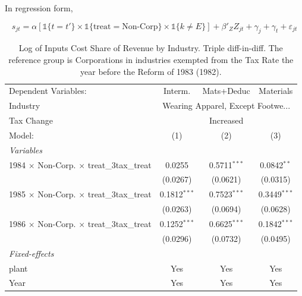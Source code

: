 \documentclass[
  12pt]{article}
\theoremstyle{definition}
\theoremstyle{remark}
\begin{document}
In regression form,

\[
s_{jt}=\alpha \left[ \mathbb{1}\{t=t'\}\times\mathbb{1}\{\text{treat}=\text{Non-Corp}\}\times\mathbb{1}\{k\not=E\} \right]+\beta'_ZZ_{jt}+\gamma_j+\gamma_t+\varepsilon_{jt}
\]

\begin{table}

\caption{\label{tbl-reg-didid}Log of Inputs Cost Share of Revenue by
Industry. Triple diff-in-diff. The reference group is Corporations in
industries exempted from the Tax Rate the year before the Reform of 1983
(1982).}

\begin{minipage}{\linewidth}

\begingroup
\centering
\begin{tabular}{lccc}
   \tabularnewline \midrule \midrule
   Dependent Variables:                                    & Interm.        & Mats+Deduc     & Materials\\  
   Industry & \multicolumn{3}{c}{Wearing Apparel, Except Footwe...} \\ 
   Tax Change & \multicolumn{3}{c}{Increased} \\ 
   Model:                                                  & (1)            & (2)            & (3)\\  
   \midrule
   \emph{Variables}\\
   1984 $\times$ Non-Corp. $\times$ treat\_3tax\_treat     & 0.0255         & 0.5711$^{***}$ & 0.0842$^{**}$\\   
                                                           & (0.0267)       & (0.0621)       & (0.0315)\\   
   1985 $\times$ Non-Corp. $\times$ treat\_3tax\_treat     & 0.1812$^{***}$ & 0.7523$^{***}$ & 0.3449$^{***}$\\   
                                                           & (0.0263)       & (0.0694)       & (0.0628)\\   
   1986 $\times$ Non-Corp. $\times$ treat\_3tax\_treat     & 0.1252$^{***}$ & 0.6625$^{***}$ & 0.1842$^{***}$\\   
                                                           & (0.0296)       & (0.0732)       & (0.0495)\\   
   \midrule
   \emph{Fixed-effects}\\
   plant                                                   & Yes            & Yes            & Yes\\  
   Year                                                    & Yes            & Yes            & Yes\\  

\end{tabular}
\end{minipage}
\end{table}
\end{document}
